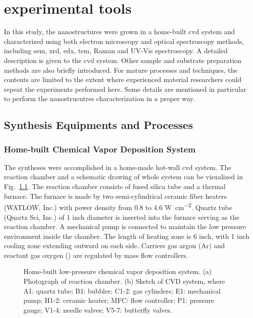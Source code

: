 
\chapter{experimental tools}

In this study, the nanostructures were grown in a home-built \gls{cvd} system and characterized using both electron microscopy and optical spectroscopy methods, including \gls{sem}, \gls{xrd}, \gls{edx}, \gls{tem}, Raman and UV-Vis spectroscopy. A detailed description is given to the \gls{cvd} system. Other sample and substrate preparation methods are also briefly introduced. For mature processes and techniques, the contents are limited to the extent where experienced material researchers could repeat the experiments performed here. Some details are mentioned in particular to perform the nanostrucutres characterization in a proper way. 

\section{Synthesis Equipments and Processes}
\subsection{Home-built Chemical Vapor Deposition System}
The syntheses were accomplished in a home-made hot-wall \gls{cvd} system. The reaction chamber and a schematic drawing of whole system can be visualized in Fig.~\ref{fig:ch2cvd}. The reaction chamber consists of fused silica tube and a thermal furnace. The furnace is made by two semi-cylindrical ceramic fiber heaters (WATLOW, Inc.) with power density from 0.8 to 4.6 \si{W cm^{-2}}. Quartz tube (Quartz Sci, Inc.) of 1 inch diameter is inserted into the furnace serving as the reaction chamber. A mechanical pump is connected to maintain the low pressure environment inside the chamber. The length of heating zone is 6 inch, with 1 inch cooling zone extending outward on each side. Carriers gas argon (Ar) and reactant gas oxygen () are regulated by mass flow controllers.

\begin{figure}[htb]
\centering
{}

\caption[Home-built low-pressure chemical vapor deposition system]{Home-built low-pressure chemical vapor deposition system. (a) Photograph of reaction chamber. (b) Sketch of CVD system, where A1: quartz tube; B1: bubbler; C1-2: gas cylinders; E1: mechanical pump; H1-2: ceramic heater; MFC: flow controller; P1: pressure gauge; V1-4: needle valves; V5-7: butterfly valves.}
\label{fig:ch2cvd}
\end{figure}

